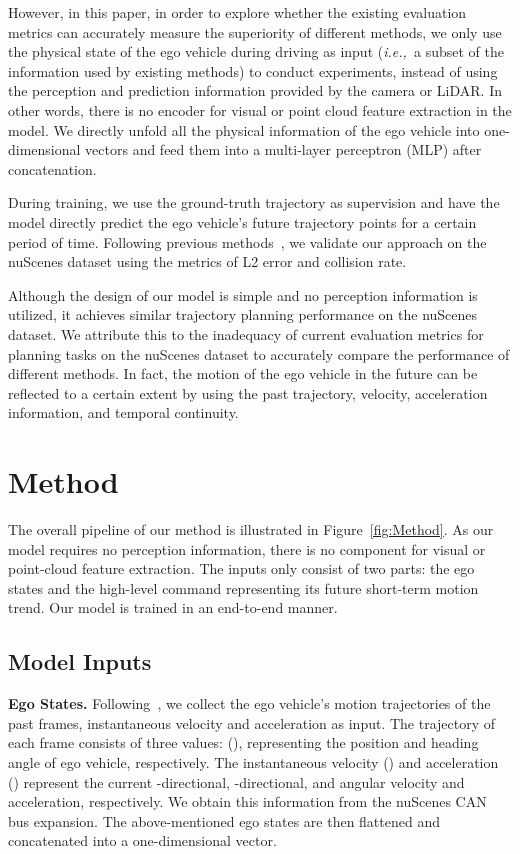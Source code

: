 \documentclass[10pt,twocolumn,letterpaper]{article}
\def\ie{\emph{i.e.,~}}
\newcommand{\myPara}[1]{\vspace{.05in}\noindent\textbf{#1.}\quad}
\begin{document}
However, in this paper, in order to explore whether the existing evaluation metrics can accurately measure the superiority of different methods, we only use the physical state of the ego vehicle during driving as input (\ie a subset of the information used by existing methods) to conduct experiments, instead of using the perception and prediction information provided by the camera or LiDAR.
In other words, there is  
no encoder for visual or point cloud feature extraction 
in the model.
We directly unfold all the physical information of the ego vehicle into one-dimensional vectors and feed them into
a multi-layer perceptron (MLP)
after concatenation.


During training, we use the ground-truth trajectory as supervision and have the model directly predict the ego vehicle's future trajectory points for a certain period of time. 
Following previous methods~\cite{hu2022st,hu2022goal}, 
we validate our approach on the nuScenes dataset using the metrics of L2 error and collision rate.



Although the design of our model is simple and no perception information is utilized, 
it achieves similar trajectory planning performance on the nuScenes dataset.
We attribute this to the inadequacy of current evaluation metrics for planning tasks on the nuScenes dataset to accurately compare the performance of different methods.
In fact, the motion of the ego vehicle in the future can be reflected to a certain extent by using the past trajectory, velocity, acceleration information, and temporal continuity. 




\section{Method}
The overall pipeline of our method is illustrated in Figure~\ref{fig:Method}. 
As our model requires no perception information, 
there is no component for 
visual or point-cloud feature extraction. 
The inputs only consist of two parts: the ego states
and the high-level command representing its future short-term motion trend. 
Our model is trained in an end-to-end manner.

\subsection{Model Inputs}
\myPara{Ego States} 
Following~\cite{jiang2023vad}, 
we collect the ego vehicle's motion trajectories of the past  frames, instantaneous velocity and acceleration as input.
The trajectory of each frame consists of 
three values: (), representing 
the position and heading angle of ego vehicle, respectively. 
The instantaneous velocity () 
and acceleration () represent
the current -directional, -directional, and angular velocity and acceleration, respectively.
We obtain this information from the nuScenes CAN bus expansion. 
The above-mentioned ego states
are then flattened and concatenated into a 
one-dimensional vector. 
\end{document}

